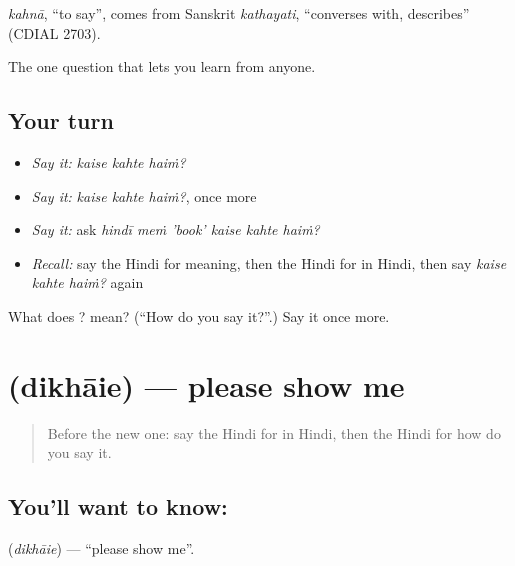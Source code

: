 \begin{cousinweb}
\emph{kahnā}, \textquotedblleft{}to say\textquotedblright{}, comes from Sanskrit \emph{kathayati}, \textquotedblleft{}converses with, describes\textquotedblright{} (CDIAL 2703).
\end{cousinweb}

\begin{grammarlens}[title={What you've built}]
The one question that lets you learn from anyone.
\end{grammarlens}

\subsection*{Your turn}
\begin{itemize}
\raggedright
  \item \emph{Say it:} \emph{kaise kahte haiṁ?}
  \item \emph{Say it:} \emph{kaise kahte haiṁ?}, once more
  \item \emph{Say it:} ask \emph{hindī meṁ 'book' kaise kahte haiṁ?}
  \item \emph{Recall:} say the Hindi for meaning, then the Hindi for in Hindi, then say \emph{kaise kahte haiṁ?} again
\end{itemize}

\begin{tcolorbox}[breakable,colback=teal!4,colframe=teal!35!black,title={Before you move on}]
What does   ? mean? (\textquotedblleft{}How do you say it?\textquotedblright{}.) Say it once more.
\end{tcolorbox}
\section[\texorpdfstring{\hi{दिखाइए} (dikhāie)}{दिखाइए (dikhāie)}]{ (dikhāie) — please show me}

\label{lesson:HI-C111-dikhaie}



\begin{quote}
Before the new one: say the Hindi for in Hindi, then the Hindi for how do you say it.
\end{quote}

\subsection*{You'll want to know: }
\textbf{} (\emph{dikhāie}) — \textquotedblleft{}please show me\textquotedblright{}.

